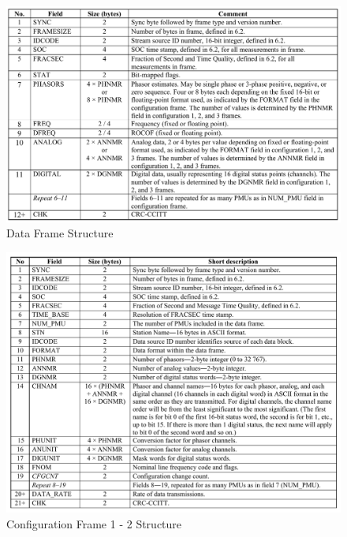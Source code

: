 \begin{figure}
	\includegraphics[width=\textwidth]{fig/data_frame.png}
	\caption{Data Frame Structure \cite{c37.118.2} }
\end{figure} 


\begin{figure}[h]
	\includegraphics[width=\textwidth]{fig/cfg_frame12.png}
	\caption{Configuration Frame 1 - 2 Structure \cite{c37.118.2}}
	\label{fig:cfg_12}
\end{figure} 

